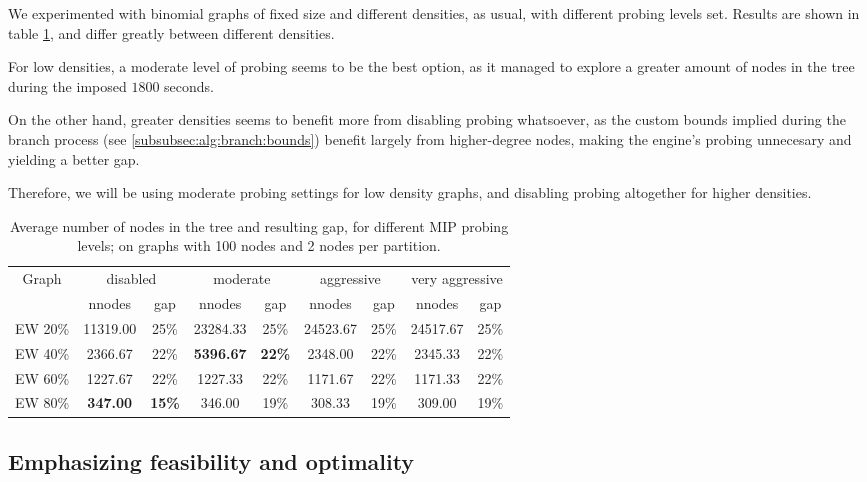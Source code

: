 We experimented with binomial graphs of fixed size and different densities, as usual, with different probing levels set. Results are shown in table \ref{table:bnc:probing}, and differ greatly between different densities.

For low densities, a moderate level of probing seems to be the best option, as it managed to explore a greater amount of nodes in the tree during the imposed $1800$ seconds. 

On the other hand, greater densities seems to benefit more from disabling probing whatsoever, as the custom bounds implied during the branch process (see \ref{subsubsec:alg:branch:bounds}) benefit largely from higher-degree nodes, making the engine's probing unnecesary and yielding a better gap.

Therefore, we will be using moderate probing settings for low density graphs, and disabling probing altogether for higher densities.

\begin{table}[h]
\centering

\begin{tabular}{|c|cc|cc|cc|cc|}
\hline
\multicolumn{1}{|c|}{Graph} & \multicolumn{2}{|c|}{disabled} & \multicolumn{2}{|c|}{moderate} & \multicolumn{2}{|c|}{aggressive} & \multicolumn{2}{|c|}{very aggressive}
\\
 & nnodes & gap & nnodes & gap & nnodes & gap & nnodes & gap
\\
\hline
EW 20\% & 11319.00 &25\% & 23284.33 &25\% & 24523.67 &25\% & 24517.67 &25\%
\\
EW 40\% & 2366.67 &22\% & \textbf{5396.67} & \textbf{22\%} & 2348.00 &22\% & 2345.33 &22\%
\\
EW 60\% & 1227.67 &22\% & 1227.33 &22\% & 1171.67 &22\% & 1171.33 &22\%
\\
EW 80\% & \textbf{347.00} & \textbf{15\%} & 346.00 &19\% & 308.33 &19\% & 309.00 &19\%
\\
\hline 
 \end{tabular}
 
\caption{Average number of nodes in the tree and resulting gap, for different MIP probing levels; on graphs with 100 nodes and 2 nodes per partition.}
\label{table:bnc:probing}

\end{table}

\subsection{Emphasizing feasibility and optimality}


